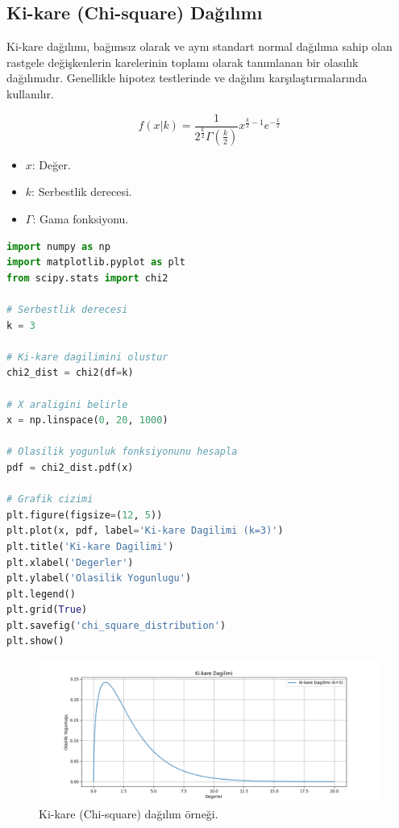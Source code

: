 \subsection{Ki-kare (Chi-square) Dağılımı}
Ki-kare dağılımı, bağımsız olarak ve aynı standart normal dağılıma sahip olan rastgele değişkenlerin karelerinin toplamı olarak tanımlanan bir olasılık dağılımıdır. Genellikle hipotez testlerinde ve dağılım karşılaştırmalarında kullanılır.

\[f(x|k) = \frac{1}{2^{\frac{k}{2}} \Gamma\left(\frac{k}{2}\right)} x^{\frac{k}{2} - 1} e^{-\frac{x}{2}}\]
\begin{itemize}
	\item $x$: Değer.
	\item $k$: Serbestlik derecesi.
	\item $\Gamma$: Gama fonksiyonu.
\end{itemize}

\begin{lstlisting}[language=Python]
import numpy as np
import matplotlib.pyplot as plt
from scipy.stats import chi2

# Serbestlik derecesi
k = 3

# Ki-kare dagilimini olustur
chi2_dist = chi2(df=k)

# X araligini belirle
x = np.linspace(0, 20, 1000)

# Olasilik yogunluk fonksiyonunu hesapla
pdf = chi2_dist.pdf(x)

# Grafik cizimi
plt.figure(figsize=(12, 5))
plt.plot(x, pdf, label='Ki-kare Dagilimi (k=3)')
plt.title('Ki-kare Dagilimi')
plt.xlabel('Degerler')
plt.ylabel('Olasilik Yogunlugu')
plt.legend()
plt.grid(True)
plt.savefig('chi_square_distribution')
plt.show()
\end{lstlisting}

\begin{figure}[h]
    \centering
    \includegraphics[width=1\textwidth]{images/chi_square_distribution.png}
    \caption{Ki-kare (Chi-square) dağılım örneği.}
    \label{fig:enter-label}
\end{figure}

